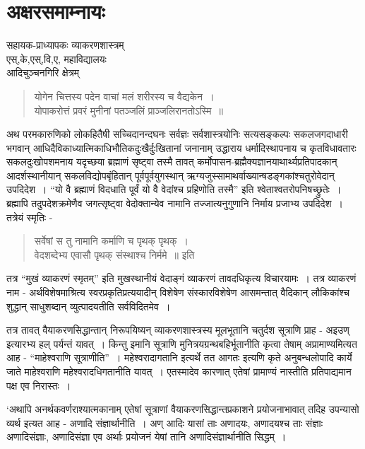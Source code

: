 {\fontsize{15}{17}\selectfont
\chapter{अक्षरसमाम्नायः}

\begin{center}
\smallskip

सहायक-प्राध्यापकः व्याकरणशास्त्रम्\\
एस्,के,एस्,वि,ए, महाविद्यालयः\\
आदिचुञ्चनगिरि क्षेत्रम् 
\addrule
\end{center}

\begin{verse}
योगेन चित्तस्य पदेन वाचां मलं शरीरस्य च वैद्यकेन~। \\
योपाकरोत्तं प्रवरं मुनीनां पतञ्जलिं प्राञ्जलिरानतोऽस्मि~॥
\end{verse}
अथ परमकारुणिको लोकहितैषी सच्चिदानन्दघनः सर्वज्ञः सर्वशास्त्रयोनिः सत्यसङ्कल्पः सकलजगदाधारी भगवान् आधिदैविकाध्यात्मिकाधिभौतिकदुःखैर्दुःखितानां जनानाम् उद्धाराय धर्मादिस्थापनाय च कृतविधावतारः सकलदुःखोपशमनाय यदृच्छया ब्रह्माणं सृष्ट्वा तस्मै तावत् कर्मोपासन-ब्रह्मैक्यज्ञानयाथार्थ्यप्रतिपादकान् आदर्शस्थानीयान् सकलविद्योपबृंहितान् पूर्वपूर्वयुगस्थान् ऋग्यजुस्सामाथर्वाख्यान्षडङ्गकांश्चतुरोवेदान् उपदिदेश~। “यो वै ब्रह्माणं विदधाति पूर्वं यो वै वेदांश्च प्रहिणोति तस्मै” इति श्वेताश्वतरोपनिषच्छ्रुतेः~। ब्रह्मापि तदुपदेशक्रमेणैव जगत्सृष्ट्वा वेदोक्तान्येव नामानि तज्जात्यनुगुणानि निर्माय प्रजाभ्य उपदिदेश~। तत्रेयं स्मृतिः -		
\begin{verse}
सर्वेषां स तु नामानि कर्माणि च पृथक् पृथक्~। \\
वेदशब्देभ्य एवासौ पृथक् संस्थाश्च निर्ममे~॥ इति
\end{verse} 		
तत्र “मुखं व्याकरणं स्मृतम्” इति मुखस्थानीयं वेदाङ्गं व्याकरणं तावदधिकृत्य विचारयामः~। तत्र व्याकरणं नाम  - अर्थविशेषमाश्रित्य स्वरप्रकृतिप्रत्ययादीन् विशेषेण संस्कारविशेषेण आसमन्तात्  वैदिकान् लौकिकांश्च शुद्धान् साधुशब्दान् व्युत्पादयतीति सर्वविदितमेव~। 

तत्र तावत् वैयाकरणसिद्धान्तान् निरूपयिष्यन् व्याकरणशास्त्रस्य मूलभूतानि चतुर्दश सूत्राणि प्राह - अइउण् इत्यारभ्य हल् पर्यन्तं यावत्~। किन्तु इमानि सूत्राणि मुनित्रयग्रन्थबहिर्भूतानीति कृत्वा तेषाम् अप्रामाण्यमित्यत आह - “माहेश्वराणि सूत्राणीति”~। महेश्वरादागतानि इत्यर्थे तत आगतः इत्यणि कृते अनुबन्धलोपादि कार्ये जाते माहेश्वराणि महेश्वरादधिगतानीति यावत्~। एतस्मादेव कारणात् एतेषां प्रामाण्यं नास्तीति प्रतिपाद्यमान पक्ष एव निरास्तः~। 

‘अथापि अनर्थकवर्णराश्यात्मकानाम् एतेषां सूत्राणां वैयाकरणसिद्धान्तप्रकाशने प्रयोजनाभावात् तदिह उपन्यासो व्यर्थ इत्यत आह - अणादि संज्ञार्थानीति~। अण् आदिः  यासां ताः अणादयः, अणादयश्च ताः संज्ञाः अणादिसंज्ञाः, अणादिसंज्ञा एव अर्थाः  प्रयोजनं येषां तानि अणादिसंज्ञार्थानीति सिद्धम्~। 

}
